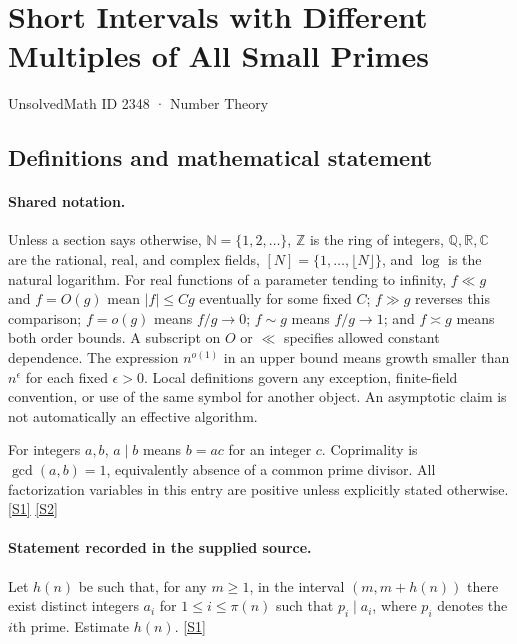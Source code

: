 \documentclass[11pt,a4paper]{article}
\newcommand{\N}{\mathbb{N}}
\newcommand{\Z}{\mathbb{Z}}
\newcommand{\Q}{\mathbb{Q}}
\newcommand{\R}{\mathbb{R}}
\newcommand{\C}{\mathbb{C}}
\newcommand{\sref}[2]{\hyperlink{source:#1:#2}{[S#2]}}
\begin{document}

\setcounter{section}{2347}

\section{Short Intervals with Different Multiples of All Small Primes}\label{2348}

{\small\sffamily UnsolvedMath ID 2348 · Number Theory}

\subsection{Definitions and mathematical statement}

\paragraph{Shared notation.}Unless a section says otherwise, $\N=\{1,2,\ldots\}$,
$\Z$ is the ring of integers, $\Q,\R,\C$ are the rational, real, and complex
fields, $[N]=\{1,\ldots,\lfloor N\rfloor\}$, and $\log$ is the natural
logarithm. For real functions of a parameter tending to infinity,
$f\ll g$ and $f=O(g)$ mean $|f|\leq Cg$ eventually for some fixed $C$;
$f\gg g$ reverses this comparison; $f=o(g)$ means $f/g\to0$;
$f\sim g$ means $f/g\to1$; and $f\asymp g$ means both order bounds.
A subscript on $O$ or $\ll$ specifies allowed constant dependence.
The expression $n^{o(1)}$ in an upper bound means growth smaller than
$n^\epsilon$ for each fixed $\epsilon>0$. Local definitions govern any
exception, finite-field convention, or use of the same symbol for another
object. An asymptotic claim is not automatically an effective algorithm.



For integers $a,b$, $a\mid b$ means $b=ac$ for an integer $c$. Coprimality is $\gcd(a,b)=1$, equivalently absence of a common prime divisor. All factorization variables in this entry are positive unless explicitly stated otherwise. \sref{2348}{1} \sref{2348}{2}

\paragraph{Statement recorded in the supplied source.}
Let $h(n)$ be such that, for any $m\geq 1$, in the interval $(m,m+h(n))$ there exist distinct integers $a_i$ for $1\leq i\leq \pi(n)$ such that $p_i\mid a_i$, where $p_i$ denotes the $i$th prime.
Estimate $h(n)$. \sref{2348}{1}
\end{document}
